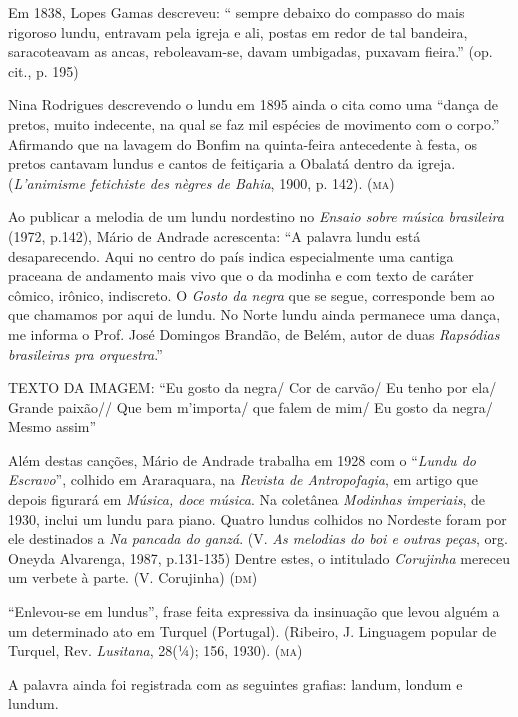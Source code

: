 Em 1838, Lopes Gamas descreveu: `` sempre debaixo do compasso do mais
rigoroso lundu, entravam pela igreja e ali, postas em redor de tal
bandeira, saracoteavam as ancas, reboleavam-se, davam umbigadas, puxavam
fieira.'' (op. cit., p. 195)

Nina Rodrigues descrevendo o lundu em 1895 ainda o cita como uma ``dança
de pretos, muito indecente, na qual se faz mil espécies de movimento com
o corpo.'' Afirmando que na lavagem do Bonfim na quinta-feira
antecedente à festa, os pretos cantavam lundus e cantos de feitiçaria a
Obalatá dentro da igreja. (\emph{L'animisme fetichiste des nègres de
Bahia}, 1900, p. 142). (\textsc{ma})

Ao publicar a melodia de um lundu nordestino no \emph{Ensaio sobre
música brasileira} (1972, p.142), Mário de Andrade acrescenta: ``A
palavra lundu está desaparecendo. Aqui no centro do país indica
especialmente uma cantiga praceana de andamento mais vivo que o da
modinha e com texto de caráter cômico, irônico, indiscreto. O
\emph{Gosto da negra} que se segue, corresponde bem ao que chamamos por
aqui de lundu. No Norte lundu ainda permanece uma dança, me informa o
Prof. José Domingos Brandão, de Belém, autor de duas \emph{Rapsódias
brasileiras pra orquestra}.''


TEXTO DA IMAGEM: ``Eu gosto da negra/ Cor de carvão/ Eu tenho por ela/
Grande paixão// Que bem m'importa/ que falem de mim/ Eu gosto da negra/
Mesmo assim''

Além destas canções, Mário de Andrade
trabalha em 1928 com o ``\emph{Lundu do Escravo}'', colhido em
Araraquara, na \emph{Revista de Antropofagia}, em artigo que depois
figurará em \emph{Música, doce música}. Na coletânea \emph{Modinhas
imperiais}, de 1930, inclui um lundu para piano. Quatro lundus colhidos
no Nordeste foram por ele destinados a \emph{Na pancada do ganzá}. (V.
\emph{As melodias do boi e outras peças}, org. Oneyda Alvarenga, 1987,
p.131-135) Dentre estes, o intitulado \emph{Corujinha} mereceu um
verbete à parte. (V. Corujinha) (\textsc{dm})

``Enlevou-se em lundus'', frase feita expressiva da insinuação que levou
alguém a um determinado ato em Turquel (Portugal). (Ribeiro, J.
Linguagem popular de Turquel, Rev. \emph{Lusitana}, 28(¼); 156, 1930).
(\textsc{ma})

A palavra ainda foi registrada com as seguintes grafias: landum, londum
e lundum.

